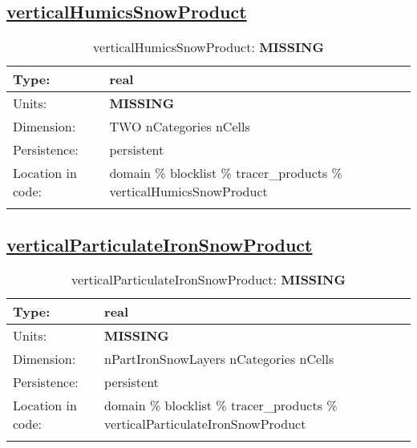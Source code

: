 \subsection[verticalHumicsSnowProduct]{\hyperref[sec:var_tab_tracer_products]{verticalHumicsSnowProduct}}
\label{subsec:var_sec_tracer_products_verticalHumicsSnowProduct}
\begin{center}
\begin{longtable}{| p{2.0in} | p{4.0in} |}
        \hline 
        Type: & real \\
        \hline 
        Units: & {\bf \color{red} MISSING} \\
        \hline 
        Dimension: & TWO nCategories nCells \\
        \hline 
        Persistence: & persistent \\
        \hline 
         Location in code: & domain \% blocklist \% tracer\_products \% verticalHumicsSnowProduct \\
         \hline 
    \caption{verticalHumicsSnowProduct: {\bf \color{red} MISSING}}
\end{longtable}
\end{center}
\subsection[verticalParticulateIronSnowProduct]{\hyperref[sec:var_tab_tracer_products]{verticalParticulateIronSnowProduct}}
\label{subsec:var_sec_tracer_products_verticalParticulateIronSnowProduct}
\begin{center}
\begin{longtable}{| p{2.0in} | p{4.0in} |}
        \hline 
        Type: & real \\
        \hline 
        Units: & {\bf \color{red} MISSING} \\
        \hline 
        Dimension: & nPartIronSnowLayers nCategories nCells \\
        \hline 
        Persistence: & persistent \\
        \hline 
         Location in code: & domain \% blocklist \% tracer\_products \% verticalParticulateIronSnowProduct \\
         \hline 
    \caption{verticalParticulateIronSnowProduct: {\bf \color{red} MISSING}}
\end{longtable}
\end{center}
